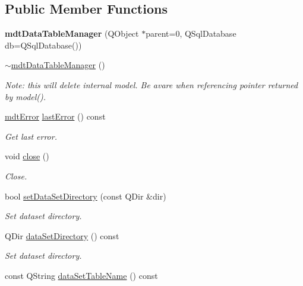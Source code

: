 \subsection*{Public Member Functions}
\begin{DoxyCompactItemize}
\item 
\hypertarget{classmdt_data_table_manager_ae63e559f597ae48a36e149afde3a8396}{
{\bfseries mdtDataTableManager} (QObject $\ast$parent=0, QSqlDatabase db=QSqlDatabase())}
\label{classmdt_data_table_manager_ae63e559f597ae48a36e149afde3a8396}

\item 
\hypertarget{classmdt_data_table_manager_a3a1c225b1aeedad8fc89b126147971ca}{
\hyperlink{classmdt_data_table_manager_a3a1c225b1aeedad8fc89b126147971ca}{$\sim$mdtDataTableManager} ()}
\label{classmdt_data_table_manager_a3a1c225b1aeedad8fc89b126147971ca}

\begin{DoxyCompactList}\small\item\em Note: this will delete internal model. Be avare when referencing pointer returned by model(). \end{DoxyCompactList}\item 
\hypertarget{classmdt_data_table_manager_aaeff001bf9a44f890078f5c6f434ec05}{
\hyperlink{classmdt_error}{mdtError} \hyperlink{classmdt_data_table_manager_aaeff001bf9a44f890078f5c6f434ec05}{lastError} () const }
\label{classmdt_data_table_manager_aaeff001bf9a44f890078f5c6f434ec05}

\begin{DoxyCompactList}\small\item\em Get last error. \end{DoxyCompactList}\item 
void \hyperlink{classmdt_data_table_manager_a368e82d3128e0c5098e09a9555bd65aa}{close} ()
\begin{DoxyCompactList}\small\item\em Close. \end{DoxyCompactList}\item 
bool \hyperlink{classmdt_data_table_manager_a1e19b3f34c1b0a91bcae4396731efc57}{setDataSetDirectory} (const QDir \&dir)
\begin{DoxyCompactList}\small\item\em Set dataset directory. \end{DoxyCompactList}\item 
QDir \hyperlink{classmdt_data_table_manager_a8fa0924a76e8f3fec9617f690cc4e148}{dataSetDirectory} () const 
\begin{DoxyCompactList}\small\item\em Set dataset directory. \end{DoxyCompactList}\item 
\hypertarget{classmdt_data_table_manager_affcbb25ab7308527885c4f3f703e7440}{
const QString \hyperlink{classmdt_data_table_manager_affcbb25ab7308527885c4f3f703e7440}{dataSetTableName} () const }
\label{classmdt_data_table_manager_affcbb25ab7308527885c4f3f703e7440}


\end{DoxyCompactItemize}
